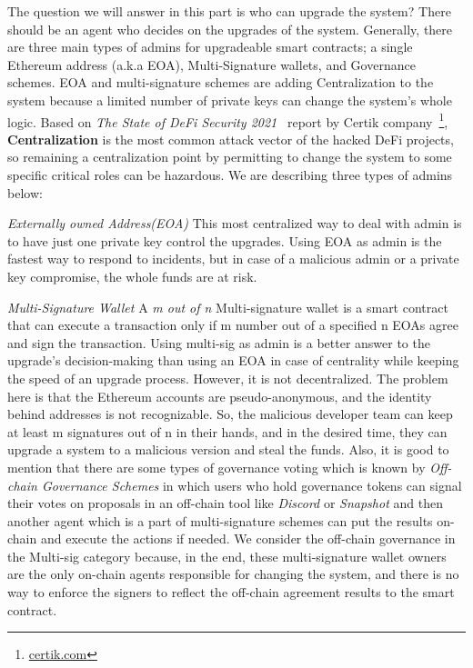 The question we will answer in this part is who can upgrade the system? There should be an agent who decides on the upgrades of the system. Generally, there are three main types of admins for upgradeable smart contracts; a single Ethereum address (a.k.a EOA), Multi-Signature wallets, and Governance schemes. EOA and multi-signature schemes are adding Centralization to the system because a limited number of private keys can change the system's whole logic. Based on \textit{The State of DeFi Security 2021}~\cite{certikReport} report by Certik company~\footnote{\url{certik.com}}, \textbf{Centralization} is the most common attack vector of the hacked DeFi projects, so remaining a centralization point by permitting to change the system to some specific critical roles can be hazardous.
We are describing three types of admins below:

\textit{Externally owned Address(EOA)}
This most centralized way to deal with admin is to have just one private key control the upgrades. Using EOA as admin is the fastest way to respond to incidents, but in case of a malicious admin or a private key compromise, the whole funds are at risk.

\textit{Multi-Signature Wallet}
A \textit{m out of n} Multi-signature wallet is a smart contract that can execute a transaction only if m number out of a specified n EOAs agree and sign the transaction. 
Using multi-sig as admin is a better answer to the upgrade's decision-making than using an EOA in case of centrality while keeping the speed of an upgrade process. However, it is not decentralized. The problem here is that the Ethereum accounts are pseudo-anonymous, and the identity behind addresses is not recognizable. So, the malicious developer team can keep at least m signatures out of n in their hands, and in the desired time, they can upgrade a system to a malicious version and steal the funds.
Also, it is good to mention that there are some types of governance voting which is known by \textit{Off-chain Governance Schemes} in which users who hold governance tokens can signal their votes on proposals in an off-chain tool like \textit{Discord} or \textit{Snapshot} and then another agent which is a part of multi-signature schemes can put the results on-chain and execute the actions if needed.
We consider the off-chain governance in the Multi-sig category because, in the end, these multi-signature wallet owners are the only on-chain agents responsible for changing the system, and there is no way to enforce the signers to reflect the off-chain agreement results to the smart contract.

